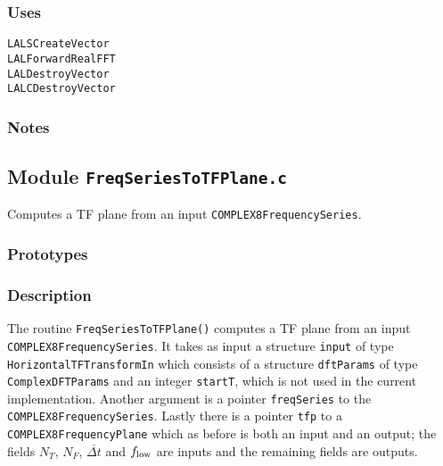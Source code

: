 \subsubsection*{Uses}
\begin{verbatim}
LALSCreateVector
LALForwardRealFFT
LALDestroyVector
LALCDestroyVector
\end{verbatim}
\subsubsection*{Notes}

\vfill{\footnotesize}

\newpage
\subsection{Module \texttt{FreqSeriesToTFPlane.c}}
\label{ss:FreqSeriesToTFPlane.c}

Computes a TF plane from an input \verb+COMPLEX8FrequencySeries+.

\subsubsection*{Prototypes}
\vspace{0.1in}


\subsubsection*{Description}

The routine \verb+FreqSeriesToTFPlane()+ computes a TF plane from an input
\verb+COMPLEX8FrequencySeries+.  It takes as input a structure \verb+input+ of
type \verb+HorizontalTFTransformIn+ which consists of a structure
\verb+dftParams+ of type \verb+ComplexDFTParams+ and an integer \verb+startT+,
which is not used in the current implementation.  Another argument is a
pointer \verb+freqSeries+ to the \verb+COMPLEX8FrequencySeries+.  Lastly there
is a pointer \verb+tfp+ to a \verb+COMPLEX8FrequencyPlane+ which as before is
both an input and an output; the fields $N_T$, $N_F$, ${\overline {\Delta t}}$
and $f_{\rm low}$ are inputs and the remaining fields are outputs.


